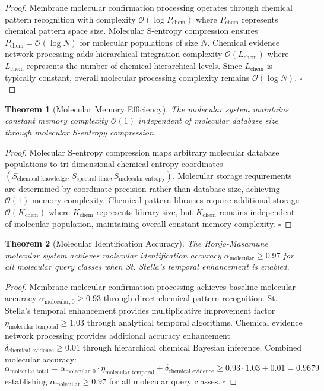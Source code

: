 \documentclass[11pt,a4paper]{article}
\newtheorem{theorem}{Theorem}[section]
\theoremstyle{remark}
\begin{document}
{{{{{{{{{{\begin{proof}
Membrane molecular confirmation processing operates through chemical pattern recognition with complexity $\mathcal{O}(\log P_{\text{chem}})$ where $P_{\text{chem}}$ represents chemical pattern space size. Molecular S-entropy compression ensures $P_{\text{chem}} = \mathcal{O}(\log N)$ for molecular populations of size $N$. Chemical evidence network processing adds hierarchical integration complexity $\mathcal{O}(L_{\text{chem}})$ where $L_{\text{chem}}$ represents the number of chemical hierarchical levels. Since $L_{\text{chem}}$ is typically constant, overall molecular processing complexity remains $\mathcal{O}(\log N)$. $\square$
\end{proof}

\begin{theorem}[Molecular Memory Efficiency]
The molecular system maintains constant memory complexity $\mathcal{O}(1)$ independent of molecular database size through molecular S-entropy compression.
\end{theorem}

\begin{proof}
Molecular S-entropy compression maps arbitrary molecular database populations to tri-dimensional chemical entropy coordinates $(S_{\text{chemical knowledge}}, S_{\text{spectral time}}, S_{\text{molecular entropy}})$. Molecular storage requirements are determined by coordinate precision rather than database size, achieving $\mathcal{O}(1)$ memory complexity. Chemical pattern libraries require additional storage $\mathcal{O}(K_{\text{chem}})$ where $K_{\text{chem}}$ represents library size, but $K_{\text{chem}}$ remains independent of molecular population, maintaining overall constant memory complexity. $\square$
\end{proof}

\begin{theorem}[Molecular Identification Accuracy]
The Honjo-Masamune molecular system achieves molecular identification accuracy $\alpha_{\text{molecular}} \geq 0.97$ for all molecular query classes when St. Stella's temporal enhancement is enabled.
\end{theorem}

\begin{proof}
Membrane molecular confirmation processing achieves baseline molecular accuracy $\alpha_{\text{molecular},0} \geq 0.93$ through direct chemical pattern recognition. St. Stella's temporal enhancement provides multiplicative improvement factor $\eta_{\text{molecular temporal}} \geq 1.03$ through analytical temporal algorithms. Chemical evidence network processing provides additional accuracy enhancement $\delta_{\text{chemical evidence}} \geq 0.01$ through hierarchical chemical Bayesian inference. Combined molecular accuracy:
\begin{equation}
\alpha_{\text{molecular total}} = \alpha_{\text{molecular},0} \cdot \eta_{\text{molecular temporal}} + \delta_{\text{chemical evidence}} \geq 0.93 \cdot 1.03 + 0.01 = 0.9679
\end{equation}
establishing $\alpha_{\text{molecular}} \geq 0.97$ for all molecular query classes. $\square$
\end{proof}

}}}}}}}}}}
\end{document}
